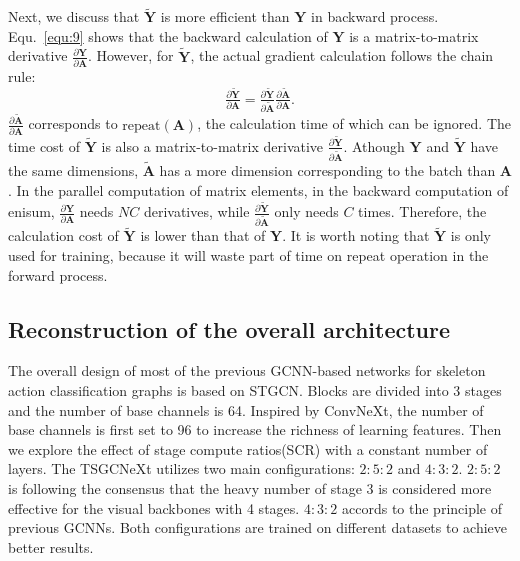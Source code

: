 \documentclass[10pt,twocolumn,letterpaper]{article}
\begin{document}
Next, we discuss that $\mathbf{\tilde{Y}}$ is more efficient than $\mathbf{Y}$ in backward process. Equ.~\ref{equ:9} shows that the backward calculation of $\mathbf{Y}$ is  a matrix-to-matrix derivative $\tfrac{\partial \mathbf{Y}}{\partial \mathbf{A}}$. However, for $\mathbf{\tilde{Y}}$, the actual gradient calculation follows the chain rule:
\begin{equation}
    \tfrac{\partial \mathbf{\tilde{Y}}}{\partial \mathbf{A}}=\tfrac{\partial \mathbf{\tilde{Y}}}{\partial \mathbf{\tilde{A}}}\tfrac{\partial \mathbf{\tilde{A}}}{\partial \mathbf{A}}.
\end{equation}
$\tfrac{\partial \mathbf{\tilde{A}}}{\partial \mathbf{A}}$  corresponds to $\text{repeat}\left( \mathbf{A}\right)$, the calculation time of which can be ignored. The time cost of $\mathbf{\tilde{Y}}$ is also a matrix-to-matrix derivative $\tfrac{\partial \mathbf{\tilde{Y}}}{\partial \mathbf{\tilde{A}}}$.  Athough $\mathbf{Y}$ and $\mathbf{\tilde{Y}}$ have the same dimensions,  $\mathbf{\tilde{A}}$ has a more dimension corresponding to the batch than $\mathbf{A}$.  In the parallel computation of matrix elements, in the backward computation of enisum, $\tfrac{\partial \mathbf{Y}}{\partial \mathbf{A}}$ needs $NC$ derivatives, while $\tfrac{\partial \mathbf{\tilde{Y}}}{\partial \mathbf{\tilde{A}}}$ only needs  $C$ times. Therefore, the calculation cost of $\mathbf{\tilde{Y}}$ is lower than that of $\mathbf{Y}$.  It is worth noting that $\mathbf{\tilde{Y}}$ is only used for training, because it will waste part of time on repeat operation in the forward process. 

\subsection{Reconstruction of the overall architecture}
\label{ssec:architecture}
The overall design of most of the previous GCNN-based networks for skeleton action classification graphs is based on STGCN. Blocks are divided into 3 stages and the number of base channels is 64. Inspired by ConvNeXt, the number of base channels is first set to 96 to increase the richness of learning features. Then we explore the effect of stage compute ratios(SCR) with a constant number of layers. The TSGCNeXt utilizes two main configurations: $2:5:2$ and $4:3:2$. $2:5:2$ is following the consensus that the heavy number of stage 3 is considered more effective for the visual backbones with 4 stages. $4:3:2$ accords to the principle of previous GCNNs. Both configurations are trained on different datasets to achieve better results.
\end{document}

